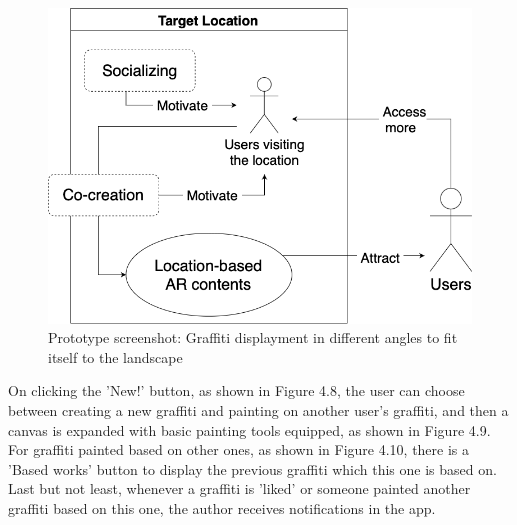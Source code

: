 \begin{figure}
  \centering
  \includegraphics[width=0.8\columnwidth]{resources/4_methodology/revitalization_with_AR_and_cocreation.png}
    \caption{Prototype screenshot: Graffiti displayment in different angles to fit itself to the landscape}
\end{figure}

On clicking the 'New!' button, as shown in Figure 4.8, the user can choose between creating a new graffiti and painting on another user's graffiti, and then a canvas is expanded with basic painting tools equipped, as shown in Figure 4.9.
For graffiti painted based on other ones, as shown in Figure 4.10, there is a 'Based works' button to display the previous graffiti which this one is based on.
Last but not least, whenever a graffiti is 'liked' or someone painted another graffiti based on this one, the author receives notifications in the app.

